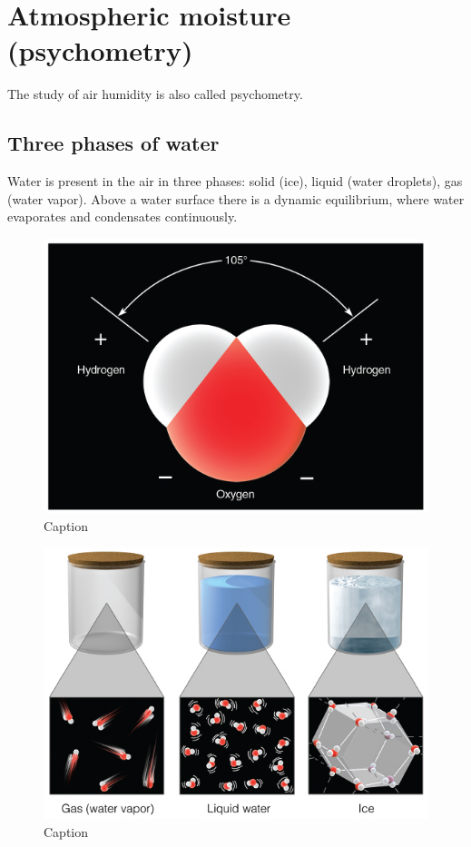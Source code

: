\documentclass[12pt,oneside]{book}
\begin{document}
\section{Atmospheric moisture
(psychometry)}\label{atmospheric-moisture-psychometry}

The study of air humidity is also called psychometry.

\subsection{Three phases of water}\label{three-phases-of-water}

Water is present in the air in three phases: solid (ice), liquid (water
droplets), gas (water vapor). Above a water surface there is a dynamic
equilibrium, where water evaporates and condensates continuously.

\begin{figure}

{\centering \includegraphics[width=0.7\linewidth]{figures/Figure223} 

}

\caption{Caption}\label{fig:Phases}
\end{figure}

\begin{figure}

{\centering \includegraphics[width=0.7\linewidth]{figures/Figure224} 

}

\caption{Caption}\label{fig:Phases2}
\end{figure}
\end{document}
